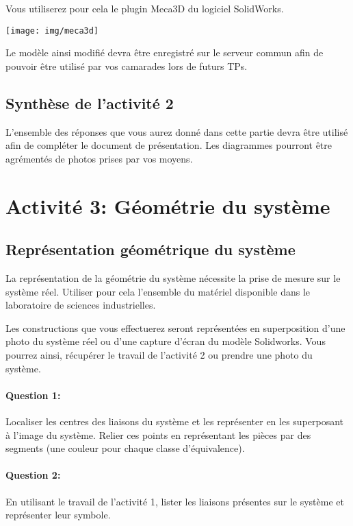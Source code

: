\begin{minipage}{0.45\linewidth}
Vous utiliserez pour cela le plugin Meca3D du logiciel SolidWorks.
\end{minipage}
\hfill
\begin{minipage}{0.5\linewidth}
\texttt{[image: img/meca3d]}
\end{minipage}

Le modèle ainsi modifié devra être enregistré sur le serveur commun afin de pouvoir être utilisé par vos camarades lors de futurs TPs.

\subsection{Synthèse de l'activité 2}

L'ensemble des réponses que vous aurez donné dans cette partie devra être utilisé afin de compléter le document de présentation. Les diagrammes pourront être agrémentés de photos prises par vos moyens.

\section{Activité 3: Géométrie du système}

\subsection{Représentation géométrique du système}

La représentation de la géométrie du système nécessite la prise de mesure sur le système réel. Utiliser pour cela l'ensemble du matériel disponible dans le laboratoire de sciences industrielles.

Les constructions que vous effectuerez seront représentées en superposition d'une photo du système réel ou d'une capture d'écran du modèle Solidworks. Vous pourrez ainsi, récupérer le travail de l'activité 2 ou prendre une photo du système.

\paragraph{Question 1:} Localiser les centres des liaisons du système et les représenter en les superposant à l'image du système. Relier ces points en représentant les pièces par des segments (une couleur pour chaque classe d'équivalence).

\paragraph{Question 2:} En utilisant le travail de l'activité 1, lister les liaisons présentes sur le système et représenter leur symbole.

